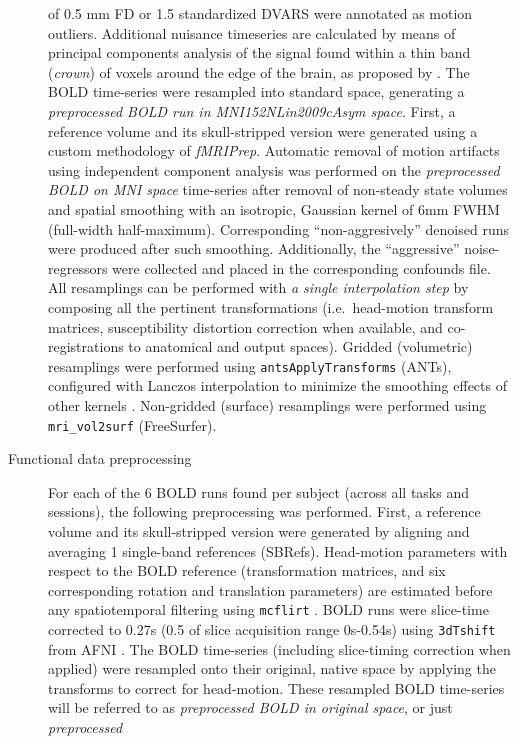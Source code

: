 \documentclass[
]{article}
\begin{document}
\begin{description}
of 0.5 mm FD or 1.5 standardized DVARS were annotated as motion
outliers. Additional nuisance timeseries are calculated by means of
principal components analysis of the signal found within a thin band
(\emph{crown}) of voxels around the edge of the brain, as proposed by
\citep{patriat_improved_2017}. The BOLD time-series were resampled into
standard space, generating a \emph{preprocessed BOLD run in
MNI152NLin2009cAsym space}. First, a reference volume and its
skull-stripped version were generated using a custom methodology of
\emph{fMRIPrep}. Automatic removal of motion artifacts using independent
component analysis \citep[ICA-AROMA,][]{aroma} was performed on the
\emph{preprocessed BOLD on MNI space} time-series after removal of
non-steady state volumes and spatial smoothing with an isotropic,
Gaussian kernel of 6mm FWHM (full-width half-maximum). Corresponding
``non-aggresively'' denoised runs were produced after such smoothing.
Additionally, the ``aggressive'' noise-regressors were collected and
placed in the corresponding confounds file. All resamplings can be
performed with \emph{a single interpolation step} by composing all the
pertinent transformations (i.e.~head-motion transform matrices,
susceptibility distortion correction when available, and
co-registrations to anatomical and output spaces). Gridded (volumetric)
resamplings were performed using \texttt{antsApplyTransforms} (ANTs),
configured with Lanczos interpolation to minimize the smoothing effects
of other kernels \citep{lanczos}. Non-gridded (surface) resamplings were
performed using \texttt{mri\_vol2surf} (FreeSurfer).
\item[Functional data preprocessing]
For each of the 6 BOLD runs found per subject (across all tasks and
sessions), the following preprocessing was performed. First, a reference
volume and its skull-stripped version were generated by aligning and
averaging 1 single-band references (SBRefs). Head-motion parameters with
respect to the BOLD reference (transformation matrices, and six
corresponding rotation and translation parameters) are estimated before
any spatiotemporal filtering using \texttt{mcflirt} \citep[FSL
6.0.5.1:57b01774,][]{mcflirt}. BOLD runs were slice-time corrected to
0.27s (0.5 of slice acquisition range 0s-0.54s) using \texttt{3dTshift}
from AFNI \citep[RRID:SCR\_005927]{afni}. The BOLD time-series
(including slice-timing correction when applied) were resampled onto
their original, native space by applying the transforms to correct for
head-motion. These resampled BOLD time-series will be referred to as
\emph{preprocessed BOLD in original space}, or just \emph{preprocessed
}
\end{description}
\end{document}
